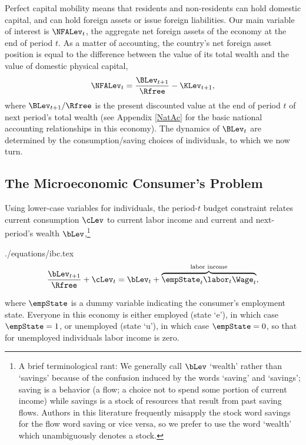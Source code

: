 \documentclass[titlepage]{\econtex}\newcommand{\texname}{cjSOE}
\begin{document}
Perfect capital mobility means that residents and non-residents can
hold domestic capital, and can hold foreign assets or issue foreign
liabilities. Our main variable of interest is $\NFALev_t$, the aggregate
net foreign assets of the economy at the end of period $t$. As a
matter of accounting, the country's net foreign asset position is
equal to the difference between the value of its total wealth and the value of domestic physical capital,
\begin{equation}
\NFALev_t = \frac{\BLev_{t+1}}{\Rfree} - \KLev_{t+1},
\label{eq:NFALev}
\end{equation}
where $\BLev_{t+1}/\Rfree$ is the present discounted value at the end of period $t$ of next
period's total wealth (see Appendix \ref{NatAc} for the basic national accounting relationships in this economy). The dynamics of $\BLev_t$ are determined by
the consumption/saving choices of individuals, to which we now turn.

\subsection{The Microeconomic Consumer's Problem}

Using lower-case variables for individuals, the period-$t$ budget
constraint relates current consumption $\cLev$ to
current labor income and current and next-period's wealth $\bLev$,\footnote{A
  brief terminological rant: We generally call $\bLev$ `wealth' rather
  than `savings' because of the confusion induced by the words
  `saving' and `savings'; saving is a behavior (a flow; a choice not
  to spend some portion of current income) while savings is a stock of
  resources that result from past saving flows.  Authors in this
  literature frequently misapply the stock word savings for the flow
  word saving or vice versa, so we prefer to use the word `wealth'
  which unambiguously denotes a stock.}
\begin{verbatimwrite}{./equations/ibc.tex}
\begin{equation}
\frac{\bLev_{t+1}}{\Rfree}+ \cLev_{t}=\bLev_{t}+\overbrace{\empState_{t} \labor_{t} \Wage_t}^{\text{labor income}},
\label{eq:ibc}
\end{equation}
\end{verbatimwrite}

where $\empState$ is a dummy variable indicating the consumer's
employment state.
Everyone in this economy is either employed (state `e'),
in which case $\empState = 1$, or unemployed (state
`u'), in which case $\empState=0$, so that for unemployed individuals labor income is zero.
\end{document}
